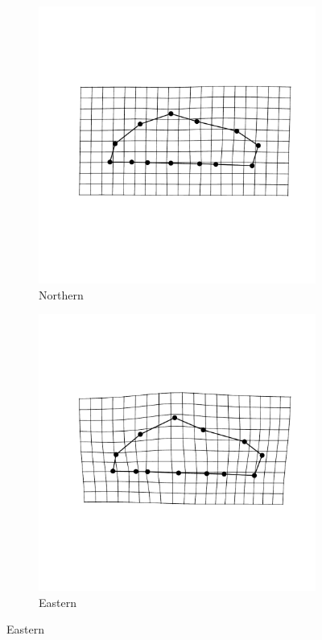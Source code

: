 \documentclass[12pt,letterpaper]{article}\usepackage{graphicx, color}
\begin{document}
\begin{figure}[ht]
  \centering
  \begin{subfigure}[b]{0.4\textwidth}
    \centering
    \includegraphics[width = \textwidth]{figure/mshape_1}
    \caption{Northern}
    \label{fig:mean_shape1}
  \end{subfigure}
  \begin{subfigure}[b]{0.4\textwidth}
    \centering
    \includegraphics[width = \textwidth]{figure/mshape_2}
    \caption{Eastern}
    \label{fig:mean_shape2}
  \end{subfigure}


\end{figure}
\end{document}
